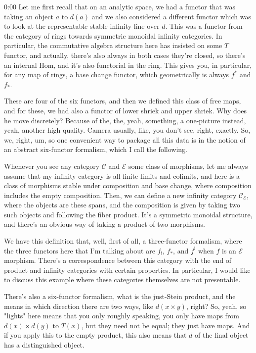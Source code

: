 \begin{unfinished}{0:00}
Let me first recall that on an analytic space, we had a functor that was taking an object $a$ to $d(a)$ and we also considered a different functor which was to look at the representable stable infinity line over $d$. This was a functor from the category of rings towards symmetric monoidal infinity categories. In particular, the commutative algebra structure here has insisted on some $T$ functor, and actually, there's also always in both cases they're closed, so there's an internal Hom, and it's also functorial in the ring. This gives you, in particular, for any map of rings, a base change functor, which geometrically is always $f^*$ and $f_*$.

These are four of the six functors, and then we defined this class of free maps, and for these, we had also a functor of lower shriek and upper shriek. Why does he move discretely? Because of the, the, yeah, something, a one-picture instead, yeah, another high quality. Camera usually, like, you don't see, right, exactly. So, we, right, um, so one convenient way to package all this data is in the notion of an abstract six-functor formalism, which I call the following.

Whenever you see any category $\mathcal{C}$ and $\mathcal{E}$ some class of morphisms, let me always assume that my infinity category is all finite limits and colimits, and here is a class of morphisms stable under composition and base change, where composition includes the empty composition. Then, we can define a new infinity category $\mathcal{C}_\mathcal{E}$, where the objects are these spans, and the composition is given by taking two such objects and following the fiber product. It's a symmetric monoidal structure, and there's an obvious way of taking a product of two morphisms.

We have this definition that, well, first of all, a three-functor formalism, where the three functors here that I'm talking about are $f_!$, $f_*$, and $f^!$ when $f$ is an $\mathcal{E}$ morphism. There's a correspondence between this category with the end of product and infinity categories with certain properties. In particular, I would like to discuss this example where these categories themselves are not presentable.

There's also a six-functor formalism, what is the just-Stein product, and the means in which direction there are two ways, like $d(x \times y)$, right? So, yeah, so "lights" here means that you only roughly speaking, you only have maps from $d(x) \times d(y)$ to $T(x)$, but they need not be equal; they just have maps. And if you apply this to the empty product, this also means that $d$ of the final object has a distinguished object.


\end{unfinished}
